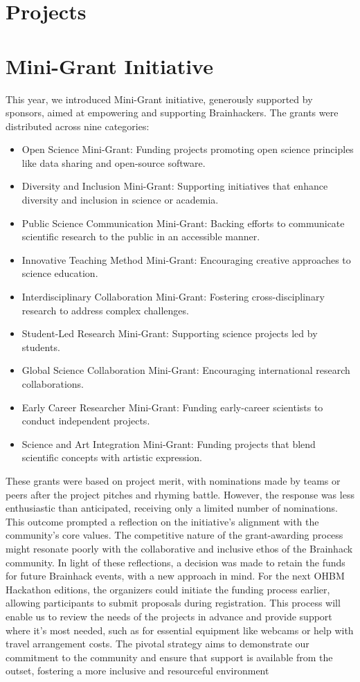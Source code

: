 \documentclass{article}
\begin{document}
\section{Projects}

\section{Mini-Grant Initiative}

This year, we introduced Mini-Grant initiative, generously supported by sponsors, aimed at empowering and supporting Brainhackers. The grants were distributed across nine categories:
\begin{itemize}
\item Open Science Mini-Grant: Funding projects promoting open science principles like data sharing and open-source software.
\item Diversity and Inclusion Mini-Grant: Supporting initiatives that enhance diversity and inclusion in science or academia.
\item Public Science Communication Mini-Grant: Backing efforts to communicate scientific research to the public in an accessible manner.
\item Innovative Teaching Method Mini-Grant: Encouraging creative approaches to science education.
\item Interdisciplinary Collaboration Mini-Grant: Fostering cross-disciplinary research to address complex challenges.
\item Student-Led Research Mini-Grant: Supporting science projects led by students.
\item Global Science Collaboration Mini-Grant: Encouraging international research collaborations.
\item Early Career Researcher Mini-Grant: Funding early-career scientists to conduct independent projects.
\item Science and Art Integration Mini-Grant: Funding projects that blend scientific concepts with artistic expression.
\end{itemize}

These grants were based on project merit, with nominations made by teams or peers after the project pitches and rhyming battle.
However, the response was less enthusiastic than anticipated, receiving only a limited number of nominations.
This outcome prompted a reflection on the initiative's alignment with the community's core values.
The competitive nature of the grant-awarding process might resonate poorly with the collaborative and inclusive ethos of the Brainhack community.
In light of these reflections, a decision was made to retain the funds for future Brainhack events, with a new approach in mind.
For the next OHBM Hackathon editions, the organizers could initiate the funding process earlier, allowing participants to submit proposals during registration.
This process will enable us to review the needs of the projects in advance and provide support where it's most needed, such as for essential equipment like webcams or help with travel arrangement costs.
The pivotal strategy aims to demonstrate our commitment to the community and ensure that support is available from the outset, fostering a more inclusive and resourceful environment
\end{document}
